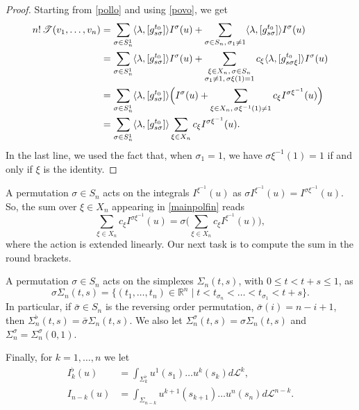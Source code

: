 \documentclass[12pt, reqno]{amsart}
\theoremstyle{plain}
\theoremstyle{definition}
\theoremstyle{remark}
\numberwithin{equation}{section}
\newcommand{\R}{\mathbb{R}}
\renewcommand{\L}{\mathcal{L}}
\newcommand{\T}{\mathcal{T}}
\newcommand{\s}{\sigma}
\newcommand{\0}{\theta}
\renewcommand{\r}{\rho}
\newcommand{\1}{{-1}}
\renewcommand{\=}{\coloneqq}
\renewcommand{\.}{\dots}
\newcommand{\be}{\begin{equation}}
\newcommand{\ee}{\end{equation}}
\begin{document}
 \begin{proof}
\renewcommand{\r}{\varrho}
Starting from  \eqref{pollo} and using  \eqref{povo}, we get
\begin{equation}
 \label{mainpol3}
 \begin{split}
 n!\,\T (v_1,\.,v_n)& =\sum_{\s\in S_n^1} \langle \lambda ,[ g_{\j\s}^{t_0} ]\rangle  I^\s(u)+
 \sum_{\s\in S_n,\,\s_1\neq1} \langle \lambda , [g_{\j\s}^{t_0}] \rangle  I^\s(u) \\
 &
 =\sum_{\s\in S_n^1}  \langle \lambda , [g_{\j\s}^{t_0}] \rangle  I^\s(u)
 +\sum_{\substack{ \xi\in X_n,\, \s\in S_n\\ \s_1\neq1,\,\s \xi(1)=1}} c_\xi \langle \lambda , [g_{\j\s\xi}^{t_0}] \rangle  I^\s(u)
 \\
 &
 =\sum_{\s\in S_n^1}  \langle \lambda , [g_{\j\s}^{t_0} ]\rangle  \Big(I^\s(u)+\sum_{{ \xi\in X_n,\, \s\xi^\1(1)\neq1} } c_\xi I^{\s\xi^\1}(u)\Big)
 \\
 &=\sum_{\s\in S_n^1}  \langle \lambda , [g_{\j\s}^{t_0}] \rangle   \sum_{\xi\in X_n} c_\xi I^{\s \xi^\1}(u) .
 \end{split}
\end{equation}
In the last line, we used the fact that, when $\s_1=1$, we have $\s\xi^{-1} (1) =1$ if and only if $\xi$ is the identity.

\end{proof}




  A permutation $\sigma\in S_n$ acts on the integrals $I^{\xi^{-1}}(u)$ as $\s I^{\xi^{-1}}(u)= I^{\s\xi^{-1}}(u)$. So,
 the sum over $\xi\in X_n$ appearing in \eqref{mainpolfin} reads
 \be \label{Intact}
  \sum_{\xi\in X_n} c_\xi I^{\sigma \xi^\1}(u) = \s \Big ( \sum_{\xi\in X_n} c_\xi I^{\xi^\1}(u)\Big),
 \ee
  where the action is extended linearly.
Our next task is to compute the sum in the round brackets.



  A permutation $\sigma\in S_n$  acts on the simplexes $\Sigma_n(t,s)$, with $0\leq t <t+s\leq 1$, as
 \be \label{simact}
  \s\Sigma_n(t,s)
  =\big\{ (t_1,\ldots,t_n)\in \R^n \mid
  t< t_{\s_n}<\ldots <t_{\s_1}<t+s\big\}.
 \ee
 In particular,
if  $\bar\s\in S_n$ is the reversing order permutation,  $\bar\s(i)=n-i+1$, then
$\Sigma_n^\flat(t,s)=\bar \sigma \Sigma_n  (t,s)$.
We   also let
$\Sigma_n^\sigma (t,s) =  \s\Sigma_n(t,s)$ and
$ \Sigma_n^\sigma =\Sigma_n^\sigma  (0,1)$.



Finally, for $k=1,\ldots,n$ we let
\[
 \begin{split}
 I_k^\flat(u) &=  \int_{\Sigma_{k}^\flat }  u^ {1} (s_1)\dots u^k(s_k)  d\L^k   ,
 \\
 I_{n-k}  (u) &=
   \int_{\Sigma_{n-k}  }   u^{k+1} (s_{k+1} )\dots u^{n}(s_n)   d\L^{n-k}.
   \end{split}
\]
\end{document}
